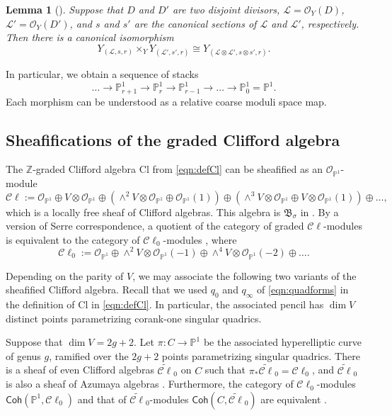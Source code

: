\documentclass[12pt, letterpaper]{amsart}
\newtheorem{lemma}[theorem]{Lemma}
\theoremstyle{definition}
\newcommand{\PP}{\mathbb{P} }
\newcommand{\ZZ}{\mathbb{Z} }
\newcommand{\cC}{\mathcal{C} }
\newcommand{\cL}{\mathcal{L} }
\newcommand{\cO}{\mathcal{O} }
\def\Cl{\mathrm{Cl}}
\begin{document}
\begin{lemma}[]
Suppose that \(D\) and \(D'\) are two disjoint divisors, \(\cL = \cO_{Y}(D)\), \(\cL' = \cO_{Y}(D')\), and \(s\) and \(s'\) are the canonical sections of \(\cL\) and \(\cL'\), respectively. Then there is a canonical isomorphism
\[Y_{(\cL, s, r)}\times_{Y}Y_{(\cL', s', r)} \cong Y_{(\cL \otimes \cL', s \otimes s', r)}.\]
\end{lemma}

In particular, we obtain a sequence of stacks
\[\dots\rightarrow\PP^{1}_{r+1}\rightarrow\PP^{1}_{r}\rightarrow\PP^{1}_{r-1}\rightarrow\dots\rightarrow\PP^{1}_{0}=\PP^{1}.\]
Each morphism can be understood as a relative coarse moduli space map.

\subsection{Sheafifications of the graded Clifford algebra}\label{ssec:sheafification}

The \(\ZZ\)-graded Clifford algebra \(\Cl\) from \eqref{eqn:defCl} can be sheafified as an \(\cO_{\PP^1}\)-module
\[
\cC\ell := \cO_{\PP^1} \oplus V \otimes \cO_{\PP^1} \oplus \left(\wedge^2 V \otimes \cO_{\PP^1} \oplus \cO_{\PP^1}(1)\right) \oplus \left(\wedge^3 V \otimes \cO_{\PP^1} \oplus V \otimes \cO_{\PP^1}(1) \right) \oplus \dots,
\]
which is a locally free sheaf of Clifford algebras. This algebra is \(\mathfrak{B}_\sigma\) in \cite[\S3.1]{Kuz08}. By a version of Serre correspondence, a quotient of the category of graded \(\cC\ell\)-modules is equivalent to the category of \(\cC\ell_0\)-modules \cite[Proposition~3.7]{Kuz08}, where
\[\cC\ell_0 := \cO_{\PP^1} \oplus \wedge^2 V \otimes \cO_{\PP^1}(-1) \oplus \wedge^4 V \otimes \cO_{\PP^1}(-2) \oplus \dots.\]

Depending on the parity of \(V\), we may associate the following two variants of the sheafified Clifford algebra. Recall that we used \(q_0\) and \(q_\infty\) of \eqref{eqn:quadforms} in the definition of \(\Cl\) in \eqref{eqn:defCl}. In particular, the associated pencil has \(\dim V\) distinct points parametrizing corank-one singular quadrics.

Suppose that \(\dim V = 2g+2\). Let \(\pi : C \to \PP^1\) be the associated hyperelliptic curve of genus \(g\), ramified over the \(2g+2\) points parametrizing singular quadrics. There is a sheaf of even Clifford algebras \(\widetilde{\cC\ell}_0\) on \(C\) such that \(\pi_*\widetilde{\cC\ell}_0 = \cC\ell_0\), and \(\widetilde{\cC\ell}_0\) is also a sheaf of Azumaya algebras \cite[Proposition~3.13]{Kuz08}. Furthermore, the category of \(\cC\ell_0\)-modules \(\mathsf{Coh}(\PP^1, \cC\ell_0)\) and that of \(\widetilde{\cC\ell}_0\)-modules \( \mathsf{Coh}(C, \widetilde{\cC\ell}_0)\) are equivalent \cite[Corollary~3.13]{Kuz08}.
\end{document}
